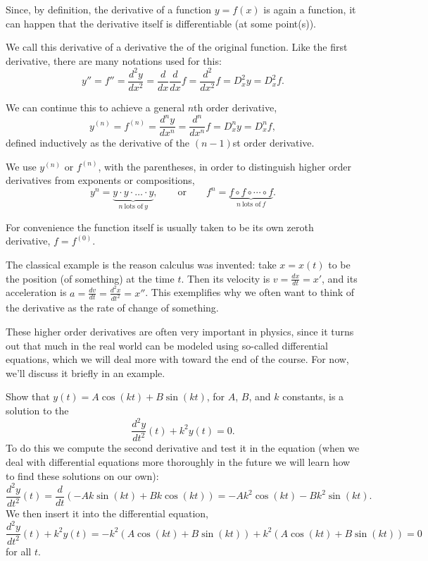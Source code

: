 
Since, by definition, the derivative of a function $y = f(x)$ is again a function, it can happen that the derivative itself is differentiable (at some point(s)).

We call this derivative of a derivative the  of the original function.
Like the first derivative, there are many notations used for this:
\[
	y'' = f'' = \frac{d^2 y}{d x^2} = \frac{d}{d x} \frac{d}{d x} f = \frac{d^2}{d x^2} f = D_x^2 y = D_x^2 f.
\]

\noindent
We can continue this to achieve a general $n$th order derivative,
\[
	y^{(n)} = f^{(n)} = \frac{d^n y}{d x^n} = \frac{d^n}{d x^n} f = D_x^n y = D_x^n f,
\]
defined inductively as the derivative of the $(n - 1)$st order derivative.

\begin{remark}
	We use $y^{(n)}$ or $f^{(n)}$, with the parentheses, in order to distinguish higher order derivatives from exponents or compositions,
	\[
		y^n = \underbrace{y \cdot y \cdot \ldots \cdot y}_{n ~\text{lots of}~ y}, \qquad \text{or} \qquad  f^n = \underbrace{f \circ f \circ \cdots \circ f}_{n~\text{lots of}~f}.
	\]
\end{remark}

\noindent
For convenience the function itself is usually taken to be its own zeroth derivative, $f = f^{(0)}$.

\begin{example}
	The classical example is the reason calculus was invented: take $x = x(t)$ to be the position (of something) at the time $t$.
	Then its velocity is $v = \frac{d x}{d t} = x'$, and its acceleration is $a = \frac{d v}{d t} = \frac{d^2 x}{d t^2} = x''$.
	This exemplifies why we often want to think of the derivative as the rate of change of something.
\end{example}

\noindent
These higher order derivatives are often very important in physics, since it turns out that much in the real world can be modeled using so-called differential equations, which we will deal more with toward the end of the course.
For now, we'll discuss it briefly in an example.

\begin{example}
	Show that $y(t) = A \cos(k t) + B \sin(k t)$, for $A$, $B$, and $k$ constants, is a solution to the 
	\[
		\frac{d^2 y}{d t^2} (t) + k^2 y(t) = 0.
	\]
	To do this we compute the second derivative and test it in the equation (when we deal with differential equations more thoroughly in the future we will learn how to find these solutions on our own):
	\[
		\frac{d^2 y}{d t^2}(t) = \frac{d}{d t} (-A k \sin(k t) + B k \cos(k t)) = -A k^2 \cos(k t) - B k^2 \sin(k t).
	\]
	We then insert it into the differential equation,
	\[
		\frac{d^2 y}{d t^2} (t) + k^2 y(t) = - k^2 (A \cos(k t) + B \sin(k t)) + k^2 (A \cos(k t) + B \sin(k t)) = 0
	\]
	for all $t$.
\end{example}

